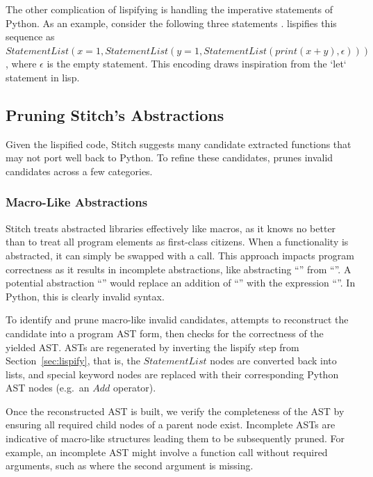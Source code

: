 The other complication of lispifying is handling the imperative statements
of Python.  As an example, consider the following three statements . 
\toolname lispifies this sequence as $StatementList(x=1, StatementList(y=1, StatementList(print(x+y), \epsilon)))$, where $\epsilon$ is the empty statement. This encoding draws inspiration from the `let` statement in lisp. 



\subsection{Pruning Stitch's Abstractions}
Given the lispified code, Stitch suggests many candidate extracted functions that may not port well back to Python. To refine these candidates, \toolname prunes invalid candidates across a few categories. 

\subsubsection{Macro-Like Abstractions}
Stitch treats abstracted libraries effectively like macros, as it knows no better than to treat all program elements as first-class citizens. When a functionality is abstracted, it can simply be swapped with a call. This approach impacts program correctness as it results in incomplete abstractions, like abstracting ``'' from ``''. A potential abstraction ``'' would replace an addition of ``'' with the expression ``''. In Python, this is clearly invalid syntax. 

To identify and prune macro-like invalid candidates, \toolname attempts to reconstruct the candidate into a program AST form, then checks for the correctness of the yielded AST. ASTs are regenerated by inverting the lispify step from Section~\ref{sec:lispify}, that is, the $StatementList$ nodes are converted back into lists, and special keyword nodes are replaced with their corresponding Python AST nodes (e.g.\ an $Add$ operator).  

Once the reconstructed AST is built, we verify the completeness of the AST by ensuring all required child nodes of a parent node exist. Incomplete ASTs are indicative of macro-like structures leading them to be subsequently pruned. For example, an incomplete AST might involve a function call without required arguments, such as  where the second argument  is missing. 

